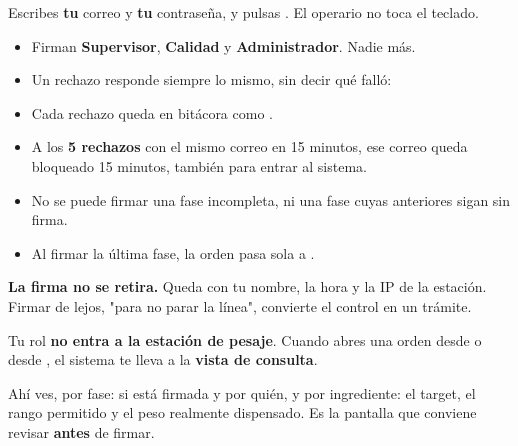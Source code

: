 
Escribes \textbf{tu} correo y \textbf{tu} contraseña, y pulsas
. El operario no toca el teclado.


\begin{itemize}
    \item Firman \textbf{Supervisor}, \textbf{Calidad} y \textbf{Administrador}. Nadie más.
    \item Un rechazo responde siempre lo mismo, sin decir qué falló:
    \item Cada rechazo queda en bitácora como .
    \item A los \textbf{5 rechazos} con el mismo correo en 15 minutos, ese correo queda
          bloqueado 15 minutos, también para entrar al sistema.
    \item No se puede firmar una fase incompleta, ni una fase cuyas anteriores sigan
          sin firma.
    \item Al firmar la última fase, la orden pasa sola a \dispensado.
\end{itemize}

\begin{cajaOjo}
\textbf{La firma no se retira.} Queda con tu nombre, la hora y la IP de la estación.
Firmar de lejos, "para no parar la línea", convierte el control en un trámite.
\end{cajaOjo}

\newpage
{}

Tu rol \textbf{no entra a la estación de pesaje}. Cuando abres una orden desde
 o desde , el sistema te lleva a la
\textbf{vista de consulta}.


\vspace{6pt}

Ahí ves, por fase: si está firmada y por quién, y por ingrediente: el target, el rango
permitido y el peso realmente dispensado. Es la pantalla que conviene revisar
\textbf{antes} de firmar.


